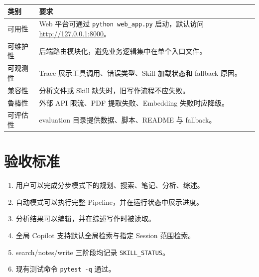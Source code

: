 \documentclass[12pt,a4paper,onecolumn]{ctexart}
\begin{document}
\begin{longtable}{p{3cm}p{10.5cm}}
\toprule
\textbf{类别} & \textbf{要求} \\
\midrule
可用性 & Web 平台可通过 \texttt{python web\_app.py} 启动，默认访问 \url{http://127.0.0.1:8000}。\\
可维护性 & 后端路由模块化，避免业务逻辑集中在单个入口文件。\\
可观测性 & Trace 展示工具调用、错误类型、Skill 加载状态和 fallback 原因。\\
兼容性 & 分析文件或 Skill 缺失时，旧写作流程不应失败。\\
鲁棒性 & 外部 API 限流、PDF 提取失败、Embedding 失败时应降级。\\
可评估性 & evaluation 目录提供数据、脚本、README 与 fallback。\\
\bottomrule
\end{longtable}

\section{验收标准}

\begin{enumerate}
  \item 用户可以完成分步模式下的规划、搜索、笔记、分析、综述。
  \item 自动模式可以执行完整 Pipeline，并在运行状态中展示进度。
  \item 分析结果可以编辑，并在综述写作时被读取。
  \item 全局 Copilot 支持默认全局检索与指定 Session 范围检索。
  \item search/notes/write 三阶段均记录 \texttt{SKILL\_STATUS}。
  \item 现有测试命令 \texttt{pytest -q} 通过。
\end{enumerate}
\end{document}
